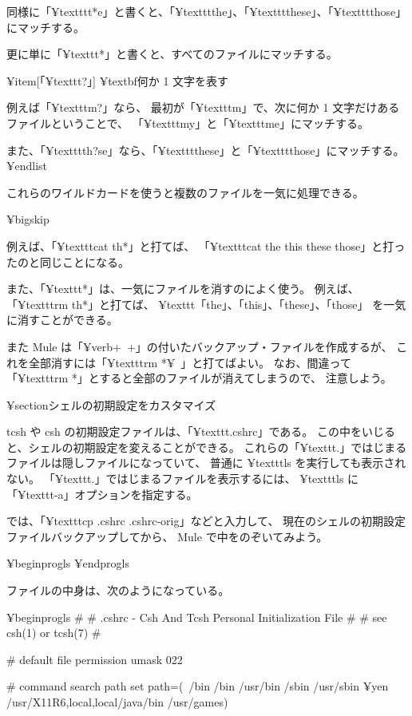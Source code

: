 同様に「¥texttt{t*e}」と書くと、「¥texttt{the}」、「¥texttt{these}」、「¥texttt{those}」
にマッチする。

更に単に「¥texttt{*}」と書くと、すべてのファイルにマッチする。

¥item[「¥texttt{?}」] ¥textbf{何か 1 文字を表す}

例えば「¥texttt{m?}」なら、 最初が「¥texttt{m}」で、次に何か 1 文字だけある
ファイルということで、
「¥texttt{my}」と「¥texttt{me}」にマッチする。

また、「¥texttt{th?se}」なら、「¥texttt{these}」と「¥texttt{those}」にマッチする。
¥end{list}

これらのワイルドカードを使うと複数のファイルを一気に処理できる。

¥bigskip

例えば、「¥texttt{cat th*}」と打てば、
「¥texttt{cat the this these those}」と打ったのと同じことになる。

また、「¥texttt{*}」は、一気にファイルを消すのによく使う。
例えば、「¥texttt{rm th*}」と打てば、
¥texttt{「the」、「this」、「these」、「those」} を一気に消すことができる。

また Mule は「¥verb+~+」の付いたバックアップ・ファイルを作成するが、
これを全部消すには「¥texttt{rm *¥~}」と打てばよい。
なお、間違って「¥texttt{rm *}」とすると全部のファイルが消えてしまうので、
注意しよう。

¥section{シェルの初期設定をカスタマイズ}

tcsh や csh の初期設定ファイルは、「¥texttt{.cshrc}」である。
この中をいじると、シェルの初期設定を変えることができる。
これらの「¥texttt{.}」ではじまるファイルは隠しファイルになっていて、
普通に ¥texttt{ls} を実行しても表示されない。
「¥texttt{.}」ではじまるファイルを表示するには、
 ¥texttt{ls} に「¥texttt{-a}」オプションを指定する。


では、「¥texttt{cp .cshrc .cshrc-orig}」などと入力して、
現在のシェルの初期設定ファイルバックアップしてから、
Mule で中をのぞいてみよう。

¥begin{progls}
%
¥end{progls}

ファイルの中身は、次のようになっている。

¥begin{progls}
#
# .cshrc - Csh And Tcsh Personal Initialization File
#
# see csh(1) or tcsh(7)
#

# default file permission
umask 022

# command search path
set path=(~/bin /bin /usr/bin /sbin /usr/sbin {¥yen}
	/usr/{X11R6,local,local/java}/bin /usr/games)

